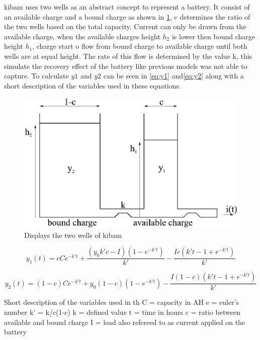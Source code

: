 \gls{kibam} uses two wells as an abstract concept to represent a battery. It consist of an available charge and a bound charge as shown in \cref{fig:kibam_wells}, c determines the ratio of the two wells based on the total capacity. Current can only be drawn from the available charge, when the available charges height $h_2$ is lower then bound charge height $h_1$, charge start o flow from bound charge to available charge until both wells are at equal height. The rate of this flow is determined by the value k, this simulate the recovery effect of the battery like previous models was not able to capture. To calculate $y{1}$ and $y{2}$ can be seen in \cref{eq:y1} and\cref{eq:y2} along with a short description of the variables used in these equations. 

\begin{figure}
	\center
	\includegraphics[width=\textwidth/2]{graphics/kibam.jpg}
	\caption{Displays the two wells of \gls{kibam}}
	\label{fig:kibam_wells}
\end{figure}

\begin{equation}\label{eq:y1}
y_1(t) = cCe^{-k't}+\frac{(y_0k'c-I)(1-e^{-k't})}{k'}-\frac{Ic(k't-1+e^{-k't})}{k'}
\end{equation}

\begin{equation}\label{eq:y2}
y_2(t) = (1-c)Ce^{-k't}+y_0(1-c)(1-e^{-k't})-\frac{I(1-c)(k't-1+e^{-k't})}{k'}
\end{equation}

Short description of the variables used in th
C = capacity in AH
e = euler's number
k' = k/c(1-c)
k = defined value
t = time in hours
c = ratio between available and bound charge
I = load also refereed to as current applied on the battery

